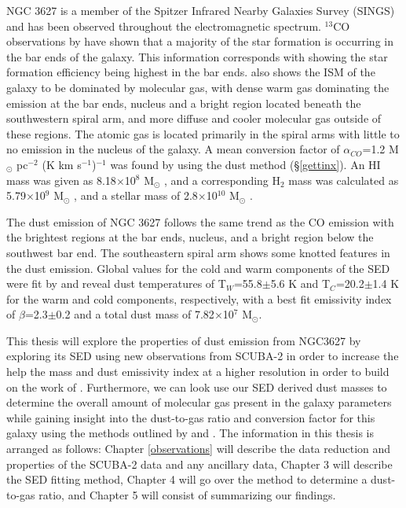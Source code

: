 NGC 3627 is a member of the Spitzer Infrared Nearby Galaxies Survey (SINGS) \citep{kennicutt2003} and has been observed throughout the electromagnetic spectrum.  $^{13}$CO observations by \cite{watanabe2011} have shown that a majority of the star formation is occurring in the bar ends of the galaxy.  This information corresponds with \cite{warren2010} showing the star formation efficiency being highest in the bar ends.  \cite{warren2010} also shows the ISM of the galaxy to be dominated by molecular gas, with dense warm gas dominating the emission at the bar ends, nucleus and a bright region located beneath the southwestern spiral arm, and more diffuse and cooler molecular gas outside of these regions.  The atomic gas is located primarily in the spiral arms with little to no emission in the nucleus of the galaxy.  A mean conversion factor of $\alpha_{CO}$=1.2 M$_\odot$ pc$^{-2}$ (K km s$^{-1}$)$^{-1}$ was found by \cite{sandstrom2013} using the dust method (\S\ref{gettinx}).  An HI mass was given as 8.18$\times$10$^8$ M$_\odot$ \citep{walter2008}, and a corresponding H$_2$ mass was calculated as 5.79$\times$10$^9$ M$_\odot$ \citep{kennicutt2003}, and a stellar mass of 2.8$\times$10$^{10}$ M$_\odot$ \citep{skibba2011}.

The dust emission of NGC 3627 follows the same trend as the CO emission with the brightest regions at the bar ends, nucleus, and a bright region below the southwest bar end.  The southeastern spiral arm shows some knotted features in the dust emission.  Global values for the cold and warm components of the SED were fit by \cite{galametz2012} and reveal dust temperatures of T$_W$=55.8$\pm$5.6 K and T$_C$=20.2$\pm$1.4 K for the warm and cold components, respectively, with a best fit emissivity index of $\beta$=2.3$\pm$0.2 and a total dust mass of 7.82$\times$10$^7$ M$_\odot$.

This thesis will explore the properties of dust emission from NGC3627 by exploring its SED using new observations from SCUBA-2 in order to increase the help the mass and dust emissivity index at a higher resolution in order to build on the work of \cite{galametz2012}.  Furthermore, we can look use our SED derived dust masses to determine the overall amount of molecular gas present in the galaxy parameters while gaining insight into the dust-to-gas ratio and conversion factor for this galaxy using the methods outlined by \cite{leroy2009} and \cite{sandstrom2013}.  The information in this thesis is arranged as follows: Chapter \ref{observations} will describe the data reduction and properties of the SCUBA-2 data and any ancillary data, Chapter 3 will describe the SED fitting method, Chapter 4 will go over the method to determine a dust-to-gas ratio, and Chapter 5 will consist of summarizing our findings.
